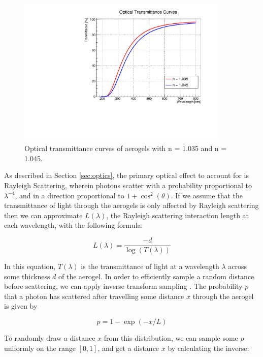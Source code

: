 \begin{figure}[]
  \centering
  \includegraphics[width=0.9\textwidth]{./figs/transmittance.pdf}
    \caption{Optical transmittance curves of aerogels with n = 1.035 and n = 1.045.}
  \label{fig:transmittance}
\end{figure}

As described in Section \ref{sec:optics}, the primary optical effect to account for is Rayleigh Scattering, wherein photons scatter with a probability proportional to $\lambda^{-4}$, and in a direction proportional to $1 + \cos^2(\theta)$.
If we assume that the transmittance of light through the aerogels is only affected by Rayleigh scattering then we can approximate $L(\lambda)$, the Rayleigh scattering interaction length at each wavelength, with the following formula:

\begin{equation}
L(\lambda) = \frac{-d}{\log(T(\lambda))}
    \label{eq:scatLength}
\end{equation}

In this equation, $T(\lambda)$ is the transmittance of light at a wavelength $\lambda$ across some thickness $d$ of the aerogel.
In order to efficiently sample a random distance before scattering, we can apply inverse transform sampling .
The probability $p$ that a photon has scattered after travelling some distance $x$ through the aerogel is given by

\begin{equation}
p = 1 - \exp(-x/L)
    \label{eq:scatProb}
\end{equation}

To randomly draw a distance $x$ from this distribution, we can sample some $p$ uniformly on the range $[0,1]$, and get a distance $x$ by calculating the inverse:

